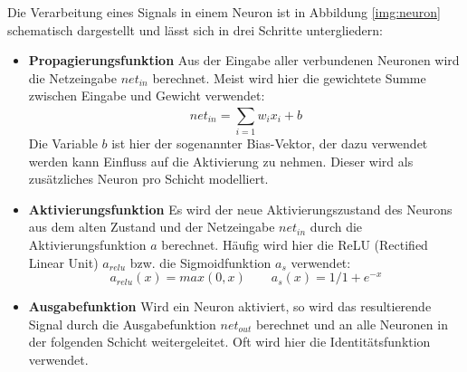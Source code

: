 Die Verarbeitung eines Signals in einem Neuron ist in Abbildung \ref{img:neuron} schematisch dargestellt und lässt sich in drei Schritte untergliedern:
\begin{itemize}
	\item \textbf{Propagierungsfunktion} Aus der Eingabe aller verbundenen Neuronen wird die Netzeingabe $net_{in}$ berechnet. Meist wird hier die gewichtete Summe zwischen Eingabe und Gewicht verwendet: 
	$$net_{in} = \sum_{i=1}^{} w_{i}x_{i} + b$$
Die Variable $b$ ist hier der sogenannter Bias-Vektor, der dazu verwendet werden kann Einfluss auf die Aktivierung zu nehmen. Dieser wird als zusätzliches Neuron pro Schicht modelliert.
	\item \textbf{Aktivierungsfunktion} Es wird der neue Aktivierungszustand des Neurons aus dem alten Zustand und der Netzeingabe $net_{in}$ durch die Aktivierungsfunktion $a$ berechnet. Häufig wird hier die ReLU (Rectified Linear Unit) $a_{relu}$ bzw. die Sigmoidfunktion $a_{s}$ verwendet:
	$$a_{relu}(x) = max(0,x) \quad \quad a_{s}(x) = 1/1+e^{-x}$$
	\item \textbf{Ausgabefunktion} Wird ein Neuron aktiviert, so wird das resultierende Signal durch die Ausgabefunktion $net_{out}$ berechnet und an alle Neuronen in der folgenden Schicht weitergeleitet. Oft wird hier die Identitätsfunktion verwendet.
\end{itemize}

